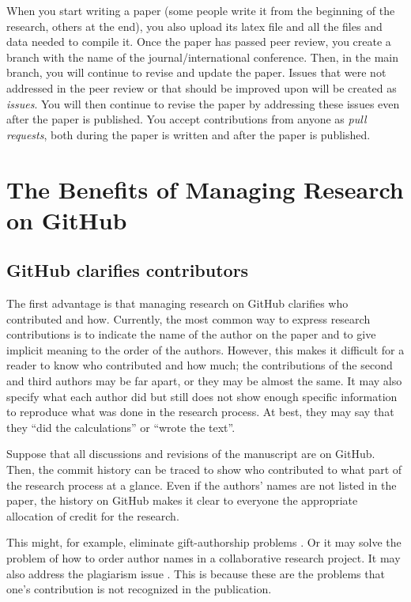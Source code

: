 \documentclass{article}
\begin{document}
When you start writing a paper (some people write it from the beginning of the research, others at the end), you also upload its latex file and all the files and data needed to compile it. Once the paper has passed peer review, you create a branch with the name of the journal/international conference. Then, in the main branch, you will continue to revise and update the paper. Issues that were not addressed in the peer review or that should be improved upon will be created as \textit{issues}. You will then continue to revise the paper by addressing these issues even after the paper is published. You accept contributions from anyone as \textit{pull requests}, both during the paper is written and after the paper is published.

\section{The Benefits of Managing Research on GitHub}

\subsection{GitHub clarifies contributors}
The first advantage is that managing research on GitHub clarifies who contributed and how. Currently, the most common way to express research contributions is to indicate the name of the author on the paper and to give implicit meaning to the order of the authors. However, this makes it difficult for a reader to know who contributed and how much; the contributions of the second and third authors may be far apart, or they may be almost the same. It may also specify what each author did but still does not show enough specific information to reproduce what was done in the research process. At best, they may say that they ``did the calculations'' or ``wrote the text''.

Suppose that all discussions and revisions of the manuscript are on GitHub. Then, the commit history can be traced to show who contributed to what part of the research process at a glance. Even if the authors’ names are not listed in the paper, the history on GitHub makes it clear to everyone the appropriate allocation of credit for the research.

This might, for example, eliminate gift-authorship problems \cite{grieger2005authorship}. Or it may solve the problem of how to order author names in a collaborative research project. It may also address the plagiarism issue \cite{anderson2011problem}. This is because these are the problems that one’s contribution is not recognized in the publication. 
\end{document}
